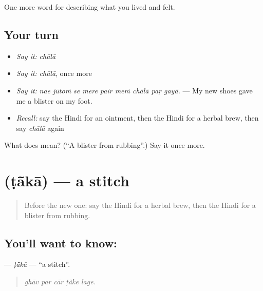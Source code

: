 \begin{grammarlens}[title={What you've built}]
One more word for describing what you lived and felt.
\end{grammarlens}

\subsection*{Your turn}
\begin{itemize}
\raggedright
  \item \emph{Say it:} \emph{chālā}
  \item \emph{Say it:} \emph{chālā}, once more
  \item \emph{Say it:} \emph{nae jūtoṁ se mere pair meṁ chālā paṛ gayā.} — My new shoes gave me a blister on my foot.
  \item \emph{Recall:} say the Hindi for an ointment, then the Hindi for a herbal brew, then say \emph{chālā} again
\end{itemize}

\begin{tcolorbox}[breakable,colback=teal!4,colframe=teal!35!black,title={Before you move on}]
What does  mean? (\textquotedblleft{}A blister from rubbing\textquotedblright{}.) Say it once more.
\end{tcolorbox}
\section[\texorpdfstring{\hi{टाँका} (ṭā̃kā)}{टाँका (ṭā̃kā)}]{ (ṭā̃kā) — a stitch}

\label{lesson:HI-C490-taka}



\begin{quote}
Before the new one: say the Hindi for a herbal brew, then the Hindi for a blister from rubbing.
\end{quote}

\subsection*{You'll want to know: }
\textbf{} — \emph{ṭā̃kā} — \textquotedblleft{}a stitch\textquotedblright{}.

\begin{quote}
    
\end{quote}

\begin{quote}
\emph{ghāv par cār ṭā̃ke lage.}
\end{quote}

